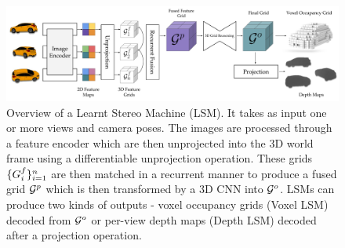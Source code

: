 \begin{figure}
\includegraphics[width=\linewidth]{figures/lsm/overview.pdf}
\caption{Overview of a Learnt Stereo Machine (LSM). It takes as input one or more views and camera poses. The images are processed through a feature encoder which are then unprojected into the 3D world frame using a differentiable unprojection operation. These grids $\mathcal{\{}{G}^f_i\}_{i=1}^n$ are then matched in a recurrent manner to produce a fused grid $\mathcal{G}^p$ which is then transformed by a 3D CNN into $\mathcal{G}^o$. LSMs can produce two kinds of outputs - voxel occupancy grids (Voxel LSM) decoded from $\mathcal{G}^o$ or per-view depth maps (Depth LSM) decoded after a projection operation.} 
\end{figure}